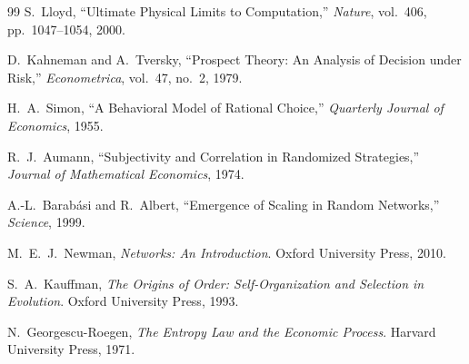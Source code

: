 \documentclass[12pt]{article}
\begin{document}
\begin{thebibliography}{99}
S.~Lloyd,
``Ultimate Physical Limits to Computation,''
\textit{Nature}, vol.~406, pp.~1047--1054, 2000.

D.~Kahneman and A.~Tversky,
``Prospect Theory: An Analysis of Decision under Risk,''
\textit{Econometrica}, vol.~47, no.~2, 1979.

H.~A.~Simon,
``A Behavioral Model of Rational Choice,''
\textit{Quarterly Journal of Economics}, 1955.

R.~J.~Aumann,
``Subjectivity and Correlation in Randomized Strategies,''
\textit{Journal of Mathematical Economics}, 1974.

A.-L.~Barab\'{a}si and R.~Albert,
``Emergence of Scaling in Random Networks,''
\textit{Science}, 1999.

M.~E.~J.~Newman,
\textit{Networks: An Introduction}.
Oxford University Press, 2010.

S.~A.~Kauffman,
\textit{The Origins of Order: Self-Organization and Selection in Evolution}.
Oxford University Press, 1993.

N.~Georgescu-Roegen,
\textit{The Entropy Law and the Economic Process}.
Harvard University Press, 1971.

\end{thebibliography}
\end{document}
